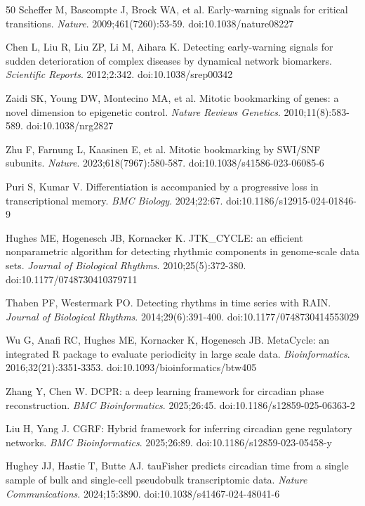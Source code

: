 \documentclass[11pt,a4paper]{article}
\begin{document}
\begin{thebibliography}{50}
Scheffer M, Bascompte J, Brock WA, et al.
Early-warning signals for critical transitions.
\textit{Nature}. 2009;461(7260):53-59. doi:10.1038/nature08227

Chen L, Liu R, Liu ZP, Li M, Aihara K.
Detecting early-warning signals for sudden deterioration of complex diseases by dynamical network biomarkers.
\textit{Scientific Reports}. 2012;2:342. doi:10.1038/srep00342

Zaidi SK, Young DW, Montecino MA, et al.
Mitotic bookmarking of genes: a novel dimension to epigenetic control.
\textit{Nature Reviews Genetics}. 2010;11(8):583-589. doi:10.1038/nrg2827

Zhu F, Farnung L, Kaasinen E, et al.
Mitotic bookmarking by SWI/SNF subunits.
\textit{Nature}. 2023;618(7967):580-587. doi:10.1038/s41586-023-06085-6

Puri S, Kumar V.
Differentiation is accompanied by a progressive loss in transcriptional memory.
\textit{BMC Biology}. 2024;22:67. doi:10.1186/s12915-024-01846-9

Hughes ME, Hogenesch JB, Kornacker K.
JTK\_CYCLE: an efficient nonparametric algorithm for detecting rhythmic components in genome-scale data sets.
\textit{Journal of Biological Rhythms}. 2010;25(5):372-380. doi:10.1177/0748730410379711

Thaben PF, Westermark PO.
Detecting rhythms in time series with RAIN.
\textit{Journal of Biological Rhythms}. 2014;29(6):391-400. doi:10.1177/0748730414553029

Wu G, Anafi RC, Hughes ME, Kornacker K, Hogenesch JB.
MetaCycle: an integrated R package to evaluate periodicity in large scale data.
\textit{Bioinformatics}. 2016;32(21):3351-3353. doi:10.1093/bioinformatics/btw405

Zhang Y, Chen W.
DCPR: a deep learning framework for circadian phase reconstruction.
\textit{BMC Bioinformatics}. 2025;26:45. doi:10.1186/s12859-025-06363-2

Liu H, Yang J.
CGRF: Hybrid framework for inferring circadian gene regulatory networks.
\textit{BMC Bioinformatics}. 2025;26:89. doi:10.1186/s12859-023-05458-y

Hughey JJ, Hastie T, Butte AJ.
tauFisher predicts circadian time from a single sample of bulk and single-cell pseudobulk transcriptomic data.
\textit{Nature Communications}. 2024;15:3890. doi:10.1038/s41467-024-48041-6


\end{thebibliography}
\end{document}
